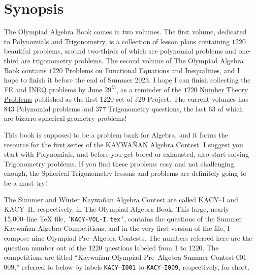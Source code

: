 \documentclass[12pt,a4paper]{memoir}
\theoremstyle{definition}
\begin{document}
\section*{Synopsis}
{
	\Large
The Olympiad Algebra Book comes in two volumes. The first volume, dedicated to Polynomials and Trigonometry, is a collection of lesson plans containing $1220$ beautiful problems, around two-thirds of which are polynomial problems and one-third are trigonometry problems. The second volume of The Olympiad Algebra Book contains $1220$ Problems on Functional Equations and Inequalities, and I hope to finish it before the end of Summer 2023. I hope I can finish collecting the FE and INEQ problems by June $29^{th}$, as a reminder of the \href{https://www.academia.edu/29934442/1220_Number_Theory_Problems_J29_Project}{$1220$ Number Theory Problems} published as the first 1220 set of J29 Project. The current volumes has $843$ Polynomial problems and $377$ Trigonometry questions, the last $63$ of which are bizarre spherical geometry problems!


\vspace{0.5em}

This book is supposed to be a problem bank for Algebra, and it forms the resource for the first series of the KAYWAÑAN Algebra Contest. I suggest you start with Polynomials, and before you get bored or exhausted, also start solving Trigonometry problems. If you find these problems easy and not challenging enough, the Spherical Trigonometry lessons and problems are definitely going to be a must try!


\vspace{0.5em}

The Summer and Winter Kaywañan Algebra Contest are called KACY--I and KACY--II, respectively, in The Olympiad Algebra Book. This large, nearly 15,000--line TeX file, \texttt{`KACY-VOL-I.tex'}, contains the questions of the Summer Kaywañan Algebra Competitions, and in the very first version of the file, I compose nine Olympiad Pre--Algebra Contests. The numbers referred here are the question number out of the 1220 questions labeled from 1 to 1220. The competitions are titled ``Kaywañan Olympiad Pre--Algebra Summer Contest 001--009,'' referred to below by labels \texttt{KACY--I001} to \texttt{KACY--I009}, respectively, for short.
}
\newpage
\end{document}
